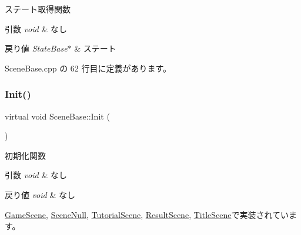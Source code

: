ステート取得関数 


\begin{DoxyParams}{引数}
{\em void} & なし \\
\hline
\end{DoxyParams}

\begin{DoxyRetVals}{戻り値}
{\em State\+Base$\ast$} & ステート \\
\hline
\end{DoxyRetVals}


 Scene\+Base.\+cpp の 62 行目に定義があります。

\mbox{\label{class_scene_base_a24d7db43c819924dc8b07b436f6d3148}} 
\subsubsection{\texorpdfstring{Init()}{Init()}}
{\footnotesize\ttfamily virtual void Scene\+Base\+::\+Init (\begin{DoxyParamCaption}{ }\end{DoxyParamCaption})\hspace{0.3cm}{\ttfamily [pure virtual]}}



初期化関数 


\begin{DoxyParams}{引数}
{\em void} & なし \\
\hline
\end{DoxyParams}

\begin{DoxyRetVals}{戻り値}
{\em void} & なし \\
\hline
\end{DoxyRetVals}


\mbox{\hyperlink{class_game_scene_a0ed06e4578a96910725641fb1a74d958}{Game\+Scene}}, \mbox{\hyperlink{class_scene_null_a6b27830a755687f2c00149bcfa739388}{Scene\+Null}}, \mbox{\hyperlink{class_tutorial_scene_a73023dcc6009590adb942c04631f3294}{Tutorial\+Scene}}, \mbox{\hyperlink{class_result_scene_a222b1c39e96888c43ae2111726576768}{Result\+Scene}}, \mbox{\hyperlink{class_title_scene_a28897f29ffe8725445bc0a27d7a865d1}{Title\+Scene}}で実装されています。

\mbox{\label{class_scene_base_a5b3fa9bbe3015ccaef844ee5b6017c3a}} 
